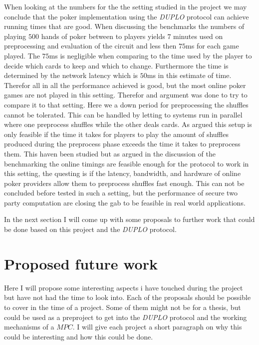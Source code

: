 \documentclass[twoside,11pt,openright]{report}
\newcommand{\DUPLO}{\textit{DUPLO} }
\begin{document}
When looking at the numbers for the the setting studied in the project we may conclude that the poker implementation using the \DUPLO protocol can achieve running times that are good. When discussing the benchmarks the numbers of playing $500$ hands of poker between to players yields $7$ minutes used on preprocessing and evaluation of the circuit and less then $75$ms for each game played. The $75$ms is negligible when comparing to the time used by the player to decide which cards to keep and which to change. Furthermore the time is determined by the network latency which is $50$ms in this estimate of time. Therefor all in all the performance achieved is good, but the most online poker games are not played in this setting. Therefor and argument was done to try to compare it to that setting. Here we a down period for preprocessing the shuffles cannot be tolerated. This can be handled by letting to systems run in parallel where one preprocess shuffles while the other deals cards. As argued this setup is only feasible if the time it takes for players to play the amount of shuffles produced during the preprocess phase exceeds the time it takes to preprocess them. This haven been studied but as argued in the discussion of the benchmarking the online timings are feasible enough for the protocol to work in this setting, the questing is if the latency, bandwidth, and hardware of online poker providers allow them to preprocess shuffles fast enough. This can not be concluded before tested in such a setting, but the performance of secure two party computation are closing the gab to be feasible in real world applications.

\bigskip

In the next section I will come up with some proposals to further work that could be done based on this project and the \DUPLO protocol.

\section{Proposed future work}
Here I will propose some interesting aspects i have touched during the project but have not had the time to look into. Each of the proposals should be possible to cover in the time of a project. Some of them might not be for a thesis, but could be used as a preproject to get into the \DUPLO protocol and the working mechanisms of a $MPC$. I will give each project a short paragraph on why this could be interesting and how this could be done.
\end{document}
